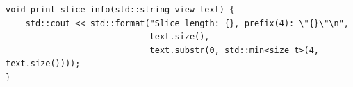 \begin{verbatim}
void print_slice_info(std::string_view text) {
    std::cout << std::format("Slice length: {}, prefix(4): \"{}\"\n", 
                             text.size(), 
                             text.substr(0, std::min<size_t>(4, text.size())));
}
\end{verbatim}
